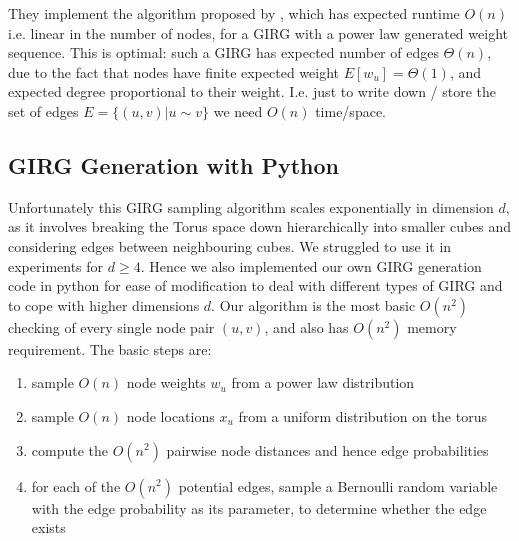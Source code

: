 They implement the algorithm proposed by \cite{bringmann2019geometric}, which has expected runtime $O(n)$ i.e. linear in the number of nodes, for a GIRG with a power law generated weight sequence.
This is optimal: such a GIRG has expected number of edges $\Theta(n)$, due to the fact that nodes have finite expected weight $E[w_u] = \Theta(1)$, and expected degree proportional to their weight. I.e. just to write down / store the set of edges $E = \{(u, v) | u \sim v \}$ we need $O(n)$ time/space.

\subsection{GIRG Generation with Python}
Unfortunately this GIRG sampling algorithm scales exponentially in dimension $d$, as it involves breaking the Torus space down hierarchically into smaller cubes and considering edges between neighbouring cubes. We struggled to use it in experiments for $d \geq 4$.
Hence we also implemented our own GIRG generation code in python for ease of modification to deal with different types of GIRG and to cope with higher dimensions $d$. 
Our algorithm is the most basic $O(n^2)$ checking of every single node pair $(u, v)$, and also has $O(n^2)$ memory requirement. The basic steps are:
\begin{enumerate}
    \item sample $O(n)$ node weights $w_u$ from a power law distribution
    \item sample $O(n)$ node locations $x_u$ from a uniform distribution on the torus
    \item compute the $O(n^2)$ pairwise node distances and hence edge probabilities
    \item for each of the $O(n^2)$ potential edges, sample a Bernoulli random variable with the edge probability as its parameter, to determine whether the edge exists
\end{enumerate}




